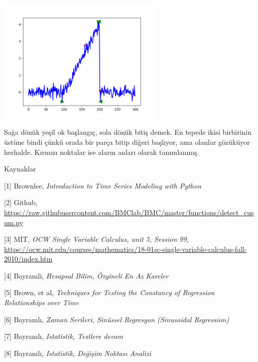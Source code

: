 \documentclass[12pt,fleqn]{article}\usepackage{../../common}
\begin{document}
\includegraphics[height=6cm]{tser_022_de_06.png}

Sağa dönük yeşil ok başlangıç, sola dönük bitiş demek. En tepede ikisi
birbirinin üstüne bindi çünkü orada bir parça bitip diğeri başlıyor, ama olanlar
gözüküyor herhalde. Kırmızı noktalar ise alarm anları olarak tanımlanmış. 

Kaynaklar

[1] Brownlee, {\em Introduction to Time Series Modeling with Python}

[2] Github, \url{https://raw.githubusercontent.com/BMClab/BMC/master/functions/detect_cusum.py}

[3] MIT, {\em OCW Single Variable Calculus, unit 5, Session 99},
         \url{https://ocw.mit.edu/courses/mathematics/18-01sc-single-variable-calculus-fall-2010/index.htm}

[4] Bayramli, {\em Hesapsal Bilim, Özyineli En Az Kareler}
         
[5] Brown, et al, {\em Techniques for Testing the Constancy of Regression Relationships over Time}

[6] Bayramlı, {\em Zaman Serileri, Sinüssel Regresyon (Sinusoidal Regression)}

[7] Bayramlı, {\em Istatistik, Testlere devam}

[8] Bayramlı, {\em Istatistik, Değişim Noktası Analizi}
\end{document}
